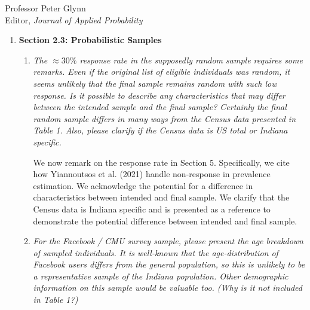 \documentclass[11pt]{letter} %
\begin{document}
\begin{letter}{Professor
	Peter Glynn\\
	Editor, {\em Journal of Applied Probability}}
\begin{enumerate}
\begin{enumerate}
	We have added Remark 3 in Section 2.2 discussing public versus government data.  Specifically, we clarify that data privacy restrictions enforce publicly released testing and case count data be aggregated to strata-level covariates and have potentially important missing information (i.e., symptom status and indicator of contact with COVID-19 positive individual).
	While these choices impact our data analytic plan, we clarify that the data analytic framework is expressly designed to guide health departments and policy makers to assess the pandemic and guide future responses.

	\vspace{5mm}
	\item {\it A timeline of restrictions and testing eligibility would be a useful addition to Section 2.2.1. Also, what there no time period where testing in Indiana was restricted on the basis of travel history or suspected exposure?}
	\vspace{5mm}

	Section 2.2.1 has a reconstructed timeline of restrictions, which was based on news reports of state-level testing restrictions.
	\vspace{5mm}
\end{enumerate}
\item {\bf Section 2.3: Probabilistic Samples}
\begin{enumerate}
	\item {\it The $\approx 30\%$ response rate in the supposedly random sample requires some remarks. Even if the original list of eligible individuals was random, it seems unlikely that the final sample remains random with such low response. Is it possible to describe any characteristics that may differ between the intended sample and the final sample? Certainly the final random sample differs in many ways from the Census data presented in Table 1. Also, please clarify if the Census data is US total or Indiana specific. }
	\vspace{5mm}

	We now remark on the response rate in Section 5.  Specifically, we cite how Yiannoutsos et al. (2021) handle non-response in prevalence estimation.  We acknowledge the potential for a difference in characteristics between intended and final sample.  We clarify that the Census data is Indiana specific and is presented as a reference to demonstrate the potential difference between intended and final sample.

	\vspace{5mm}
	\item {\it For the Facebook / CMU survey sample, please present the age breakdown of sampled individuals. It is well-known that the age-distribution of Facebook users differs from the general population, so this is unlikely to be a representative sample of the Indiana population. Other demographic information on this sample would be valuable too. (Why is it not included in Table 1?)}
	\vspace{5mm}


\end{enumerate}
\end{enumerate}
\end{letter}
\end{document}
